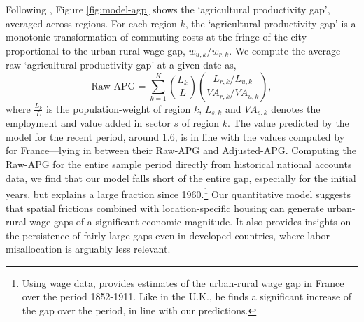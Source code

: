 \documentclass[./20250130-paper.tex]{subfiles}
\begin{document}



Following \cite{gollin2014agricultural}, Figure \ref{fig:model-agp} shows the `agricultural productivity gap', averaged across regions. For each region $k$, the `agricultural productivity gap' is a monotonic transformation of commuting costs at the fringe of the city---proportional to the urban-rural wage gap, $w_{u,k}/w_{r,k}$. We compute the average raw `agricultural productivity gap' at a given date as, 
\begin{equation*}
\text{Raw-APG}=\sum_{k=1}^{K}\left( \frac{L_k}{L}\right) \left( \frac{L_{r,k}/L_{u,k}}{VA_{r,k}/VA_{u,k}}\right),
\end{equation*}
where $\frac{L_k}{L}$ is the population-weight of region $k$, $L_{s,k}$ and $VA_{s,k}$ denotes the employment and value added in sector $s$ of region $k$. The value predicted by the model for the recent period, around 1.6, is in line with the values computed by \cite{gollin2014agricultural} for France---lying in between their Raw-APG and Adjusted-APG. Computing the Raw-APG for the entire sample period directly from historical national accounts data, we find that our model falls short of the entire gap, especially for the initial years, but explains a large fraction since 1960.\footnote{Using wage data, \cite{sicsic1992} provides estimates of the urban-rural wage gap in France over the period 1852-1911. Like in the U.K., he finds a significant increase of the gap over the period, in line with our predictions.} Our quantitative model suggests that spatial frictions combined with location-specific housing can generate urban-rural wage gaps of a significant economic magnitude. It also provides insights on the persistence of fairly large gaps even in developed countries, where labor misallocation is arguably less relevant.
\end{document}
